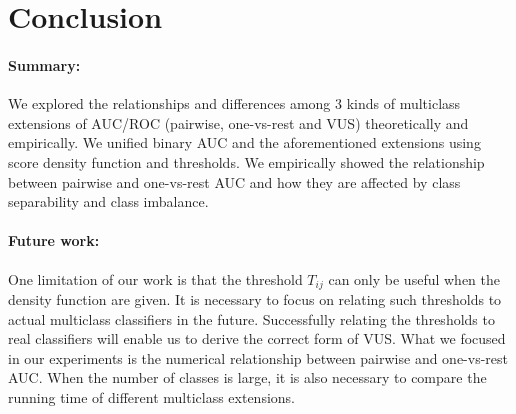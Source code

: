 \documentclass[twoside,11pt]{article}
\renewcommand{\>}{{\rightarrow}}
\newcommand{\1}{{\mathbf 1}}
\newcommand{\0}{{\mathbf 0}}
\begin{document}

\section{Conclusion}
\paragraph{Summary:}
We explored the relationships and differences among 3 kinds of multiclass extensions of AUC/ROC (pairwise, one-vs-rest and VUS) theoretically and empirically. We unified binary AUC and the aforementioned extensions using score density function and thresholds. We empirically showed the relationship between pairwise and one-vs-rest AUC and how they are affected by class separability and class imbalance.

\paragraph{Future work:}
One limitation of our work is that the threshold $T_{ij}$ can only be useful when the density function are given. It is necessary to focus on relating such thresholds to actual multiclass classifiers in the future. Successfully relating the thresholds to real classifiers will enable us to derive the correct form of VUS.
What we focused in our experiments is the numerical relationship between pairwise and one-vs-rest AUC. When the number of classes is large, it is also necessary to compare the running time of different multiclass extensions. 


\newpage



\end{document}
